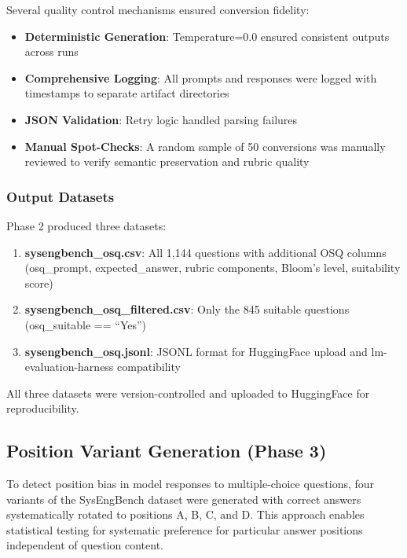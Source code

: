 Several quality control mechanisms ensured conversion fidelity:

\begin{itemize}
    \item \textbf{Deterministic Generation}: Temperature=0.0 ensured consistent outputs across runs
    \item \textbf{Comprehensive Logging}: All prompts and responses were logged with timestamps to separate artifact directories
    \item \textbf{JSON Validation}: Retry logic handled parsing failures
    \item \textbf{Manual Spot-Checks}: A random sample of 50 conversions was manually reviewed to verify semantic preservation and rubric quality
\end{itemize}

\subsubsection{Output Datasets}

Phase 2 produced three datasets:

\begin{enumerate}
    \item \textbf{sysengbench\_osq.csv}: All 1,144 questions with additional OSQ columns (osq\_prompt, expected\_answer, rubric components, Bloom's level, suitability score)
    \item \textbf{sysengbench\_osq\_filtered.csv}: Only the 845 suitable questions (osq\_suitable == ``Yes'')
    \item \textbf{sysengbench\_osq.jsonl}: JSONL format for HuggingFace upload and lm-evaluation-harness compatibility
\end{enumerate}

All three datasets were version-controlled and uploaded to HuggingFace for reproducibility.

\subsection{Position Variant Generation (Phase 3)}\label{sec:phase3}

To detect position bias in model responses to multiple-choice questions, four variants of the SysEngBench dataset were generated with correct answers systematically rotated to positions A, B, C, and D. This approach enables statistical testing for systematic preference for particular answer positions independent of question content.

